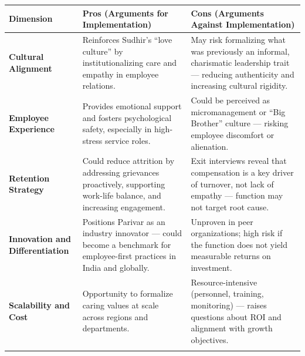 \documentclass[10pt,a4paper]{book}
\begin{document}
\clearpage


\begin{table}[H]
\centering
\renewcommand{\arraystretch}{1.4}
\begin{tabular}{|p{4.2cm}|p{6cm}|p{6cm}|}
\hline
\rowcolor{gray!30}
\textbf{Dimension} & \textbf{Pros (Arguments for Implementation)} & \textbf{Cons (Arguments Against Implementation)} \\
\hline

\textbf{Cultural Alignment} & 
Reinforces Sudhir’s “love culture” by institutionalizing care and empathy in employee relations. &
May risk formalizing what was previously an informal, charismatic leadership trait — reducing authenticity and increasing cultural rigidity. \\
\hline

\textbf{Employee Experience} &
Provides emotional support and fosters psychological safety, especially in high-stress service roles. &
Could be perceived as micromanagement or “Big Brother” culture — risking employee discomfort or alienation. \\
\hline

\textbf{Retention Strategy} &
Could reduce attrition by addressing grievances proactively, supporting work-life balance, and increasing engagement. &
Exit interviews reveal that compensation is a key driver of turnover, not lack of empathy — function may not target root cause. \\
\hline

\textbf{Innovation and Differentiation} &
Positions Parivar as an industry innovator — could become a benchmark for employee-first practices in India and globally. &
Unproven in peer organizations; high risk if the function does not yield measurable returns on investment. \\
\hline

\textbf{Scalability and Cost} &
Opportunity to formalize caring values at scale across regions and departments. &
Resource-intensive (personnel, training, monitoring) — raises questions about ROI and alignment with growth objectives. \\
\hline

\rowcolor{gray!20}
\multicolumn{3}{|c|}{\textbf{Strategic Recommendations}} \\
\hline


\end{tabular}
\end{table}
\end{document}
